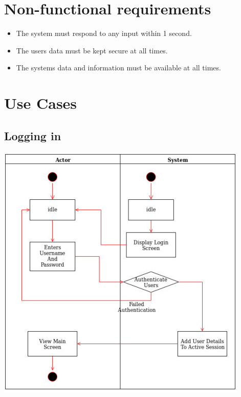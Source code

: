 \documentclass[11pt]{article}
\begin{document}
	\section{Non-functional requirements}
	\begin{itemize}
		\item The system must respond to any input within 1 second.
		\item The users data must be kept secure at all times.
		\item The systems data and information must be available at all times.
	\end{itemize}
	\section{Use Cases}
	\subsection{Logging in}
	\includegraphics[scale=1]{LogIn.png}
\end{document}
